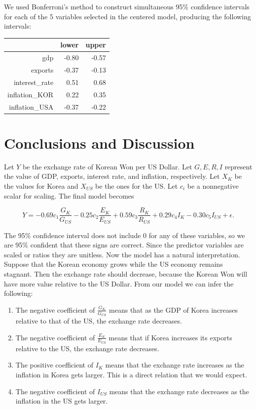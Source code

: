 \documentclass[12pt]{article}
\begin{document}
We used Bonferroni's method to construct simultaneous 95\% confidence intervals
for each of the 5 variables selected in the centered model, producing the
following intervals:

\begin{table}[ht]
\centering
\begin{tabular}{rrr}
  \hline
 & lower & upper \\
  \hline
  gdp & -0.80 & -0.57 \\
  exports & -0.37 & -0.13 \\
  interest\_rate & 0.51 & 0.68 \\
  inflation\_KOR & 0.22 & 0.35 \\
  inflation\_USA & -0.37 & -0.22 \\
   \hline
\end{tabular}
\end{table}

\section{Conclusions and Discussion}

Let $Y$ be the exchange rate of Korean Won per US Dollar. Let $G, E, R, I$
represent the value of GDP, exports, interest rate, and inflation, respectively.
Let $X_K$ be the values for Korea and $X_{US}$ be the ones for the US. Let
$c_i$ be a nonnegative scalar for scaling.
The final model becomes

\[
    Y = -0.69 c_1 \frac{G_{K}}{G_{US}}
    -0.25 c_2 \frac{E_{K}}{E_{US}}
    +0.59 c_3 \frac{R_{K}}{R_{US}}
    +0.29 c_4I_{K} - 0.30 c_5 I_{US} + \epsilon.
\]

The 95\% confidence interval does not include 0 for any of these variables,
so we are 95\% confident that these signs are correct. Since the predictor variables
are scaled or ratios they are unitless. Now the model has a
natural interpretation. Suppose that the Korean economy grows while the US
economy remains stagnant. Then the exchange rate should decrease, because
the Korean Won will have more value relative to the US Dollar.
From our model we can infer the following:

\begin{enumerate}
    \item The negative coefficient of $\frac{G_{K}}{G_{US}}$ means that as
        the GDP of Korea increases relative to that of the US, the exchange
        rate decreases. 
    \item The negative coefficient of $\frac{E_{K}}{E_{US}}$ means that if
        Korea increases its exports relative to the US, the exchange rate
        decreases.
    \item The positive coefficient of $I_K$ means that the exchange rate
        increases as the inflation in Korea gets larger. This is a direct
        relation that we would expect.
    \item The negative coefficient of $I_{US}$ means that the exchange rate
        decreases as the inflation in the US gets larger.
\end{enumerate}
\end{document}
